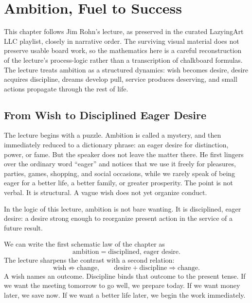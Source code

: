 \chapter{Ambition, Fuel to Success}

This chapter follows Jim Rohn's lecture, as preserved in the curated LazyingArt LLC playlist, closely in narrative order. The surviving visual material does not preserve usable board work, so the mathematics here is a careful reconstruction of the lecture's process-logic rather than a transcription of chalkboard formulas. The lecture treats ambition as a structured dynamics: wish becomes desire, desire acquires discipline, dreams develop pull, service produces deserving, and small actions propagate through the rest of life.

\section{From Wish to Disciplined Eager Desire}

The lecture begins with a puzzle. Ambition is called a mystery, and then immediately reduced to a dictionary phrase: an eager desire for distinction, power, or fame. But the speaker does not leave the matter there. He first lingers over the ordinary word ``eager'' and notices that we use it freely for pleasures, parties, games, shopping, and social occasions, while we rarely speak of being eager for a better life, a better family, or greater prosperity. The point is not verbal. It is structural. A vague wish does not yet organize conduct.

\begin{definition}
In the logic of this lecture, ambition is not bare wanting. It is disciplined, eager desire: a desire strong enough to reorganize present action in the service of a future result.
\end{definition}

We can write the first schematic law of the chapter as
\begin{equation}
\text{ambition}=\text{disciplined, eager desire}.
\end{equation}
The lecture sharpens the contrast with a second relation:
\begin{equation}
\text{wish} \not\Rightarrow \text{change},
\qquad
\text{desire}+\text{discipline}\Rightarrow \text{change}.
\end{equation}
A wish names an outcome. Discipline binds that outcome to the present tense. If we want the meeting tomorrow to go well, we prepare today. If we want money later, we save now. If we want a better life later, we begin the work immediately.

